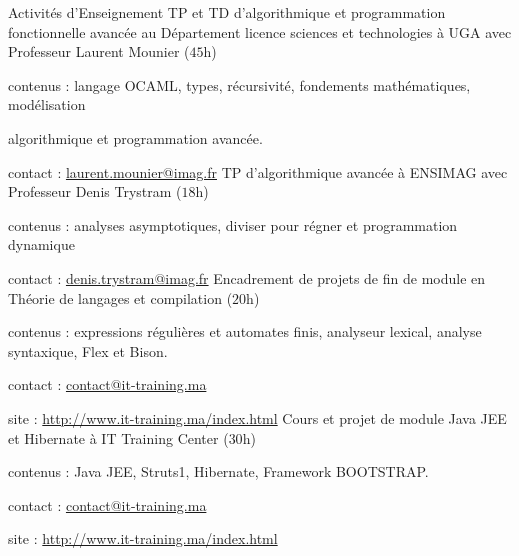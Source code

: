 

\begin{rubric}{Activités d’Enseignement}
\entry*[$2016$ -- $2017$]%
	TP et TD d'algorithmique et programmation fonctionnelle avancée au Département licence sciences et technologies à UGA avec Professeur Laurent Mounier ($45$h)
	\par contenus : langage OCAML, types, récursivité, fondements mathématiques, modélisation   
    \par algorithmique et programmation avancée.
	\par contact :  \href{mailto:laurent.mounier@imag.fr}{laurent.mounier@imag.fr}
%
\entry*[$2016$ -- $2017$]%
	TP d'algorithmique avancée à ENSIMAG avec Professeur Denis Trystram ($18$h)
	\par contenus : analyses asymptotiques, diviser pour régner et programmation dynamique
	\par contact :  \href{mailto:denis.trystram@imag.fr}{denis.trystram@imag.fr}
%
\entry*[$2014$ -- $2015$]
        Encadrement de projets de fin de module en Théorie de langages et compilation ($20$h)
	\par contenus : expressions régulières et automates finis, analyseur lexical, analyse syntaxique, Flex et Bison.
	\par contact :  \href{mailto:contact@it-training.ma}{contact@it-training.ma}
	\par site : \url{http://www.it-training.ma/index.html}
%
\entry*[$2014$ -- $2015$]%
        Cours et projet de module Java JEE et Hibernate à IT Training Center ($30$h)
	\par contenus : Java JEE, Struts1, Hibernate, Framework BOOTSTRAP.
	\par contact :  \href{mailto:contact@it-training.ma}{contact@it-training.ma}
	\par site : \url{http://www.it-training.ma/index.html}
%
\end{rubric}

